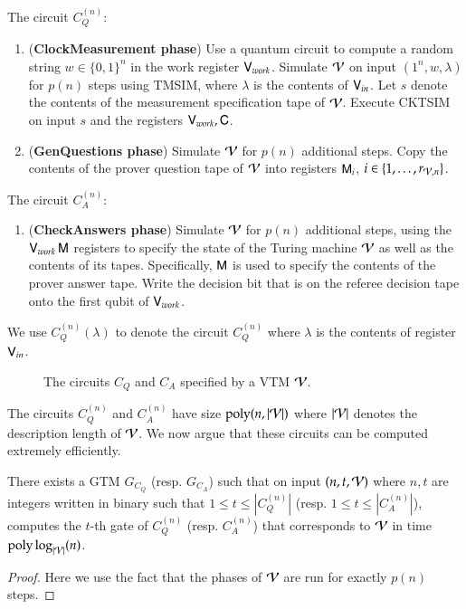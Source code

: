 \begin{center}
\begin{mdframed}
	The circuit $C_Q^{(n)}$:
	  \begin{enumerate}
        \item (\textbf{ClockMeasurement phase}) Use a quantum circuit to compute a random string $w \in \{0,1\}^n$ in the work register ${\mathsf{V}}_{work}$. 
Simulate $\mathcal V$ on input $(1^n,w,\lambda)$ for $p(n)$ steps using TMSIM, where $\lambda$ is the contents of ${\mathsf{V}}_{in}$. Let $s$ denote the contents of the measurement specification tape of $\mathcal V$.   Execute CKTSIM on input $s$ and the registers ${\mathsf{V}}_{work}, {\mathsf{C}}$.
        \item (\textbf{GenQuestions phase}) Simulate $\mathcal V$ for $p(n)$ additional steps. Copy the contents of the prover question tape of $\mathcal V$ into registers ${\mathsf{M}}_{i}$, $i\in\{1,\ldots,r_{\mathcal V,n}\}$.
    \end{enumerate}
    
    \medskip
	The circuit $C_A^{(n)}$:
	  \begin{enumerate}    
        \item (\textbf{CheckAnswers phase}) Simulate $\mathcal V$ for $p(n)$ additional steps, using the ${\mathsf{V}}_{work} \, {\mathsf{M}}$ registers to specify the state of the Turing machine $\mathcal V$ as well as the contents of its tapes. Specifically, ${\mathsf{M}}$ is used to specify the contents of the prover answer tape. Write the decision bit that is on the referee decision tape onto the first qubit of ${\mathsf{V}}_{work}$.
        \end{enumerate}    
        
        \medskip
       	We use $C_Q^{(n)}(\lambda)$ to denote the circuit $C_Q^{(n)}$ where $\lambda$ is the contents of register ${\mathsf{V}}_{in}$.
\end{mdframed}
\begin{figure}[H]
\caption{The circuits $C_Q$ and $C_A$ specified by a VTM $\mathcal V$.}
\label{fig:vtm_circuits}
\end{figure}
\end{center}

The circuits $C_Q^{(n)}$ and $C_A^{(n)}$ have size $\operatorname{poly}(n,|\mathcal V|)$ where $|\mathcal V|$ denotes the description length of $\mathcal V$. We now argue that these circuits can be computed extremely efficiently. 
\begin{lemma}
\label{lem:succinct_vtm_circuits}
	There exists a GTM $G_{C_Q}$ (resp. $G_{C_A}$) such that on input $(n,t,\mathcal V)$ where $n,t$ are integers written in binary such that $1 \leq t \leq |C_Q^{(n)}|$ (resp. $1 \leq t \leq |C_A^{(n)}|$), computes the $t$-th gate of $C_Q^{(n)}$ (resp. $C_A^{(n)}$) that corresponds to $\mathcal V$  in time $\operatorname{poly} \log_{|\mathcal V|} (n)$.
\end{lemma}
\begin{proof}
Here we use the fact that the phases of $\mathcal V$ are run for exactly $p(n)$ steps.
\end{proof}


